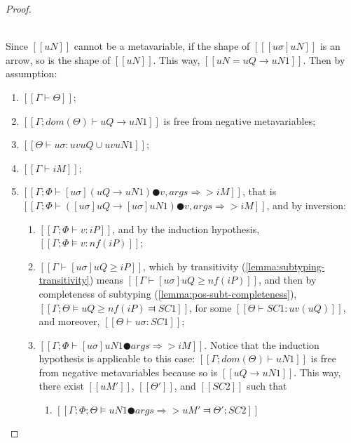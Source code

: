\begin{proof}
\begin{caseof}
        \item {}\\
            Since $[[uN]]$ cannot be a metavariable,  
            if the shape of $[[ [uσ]uN ]]$ is an arrow, 
            so is the shape of $[[uN]]$. This way, 
            $[[uN = uQ → uN1]]$.
            Then by assumption:
            \begin{enumerate}
                \item $[[Γ ⊢ Θ]]$;
                \item $[[Γ; dom(Θ) ⊢  uQ → uN1]]$ is free from negative metavariables;
                \item $[[Θ ⊢ uσ : uv uQ ∪ uv uN1]]$;
                \item $[[Γ ⊢ iM]]$;
                \item $[[Γ; Φ ⊢ [uσ](uQ → uN1) ● v, args ⇒> iM]]$, 
                    \label{point:typing-completeness-arrow-app-inversion}
                    that is $[[Γ; Φ ⊢ ([uσ]uQ → [uσ]uN1) ● v, args ⇒> iM]]$,
                    and by inversion:
                    \begin{enumerate}
                        \item $[[Γ; Φ ⊢ v : iP]]$,
                            and by the induction hypothesis, 
                            $[[Γ; Φ ⊨ v : nf(iP)]]$;
                        \item $[[Γ ⊢ [uσ]uQ ≥ iP]]$, 
                            which by transitivity (\cref{lemma:subtyping-transitivity}) means 
                            $[[Γ ⊢ [uσ]uQ ≥ nf(iP)]]$,
                            and then by completeness of subtyping 
                            (\cref{lemma:pos-subt-completeness}),
                            $[[ Γ; Θ ⊨ uQ ≥ nf(iP) ⫤ SC1 ]]$, 
                            for some $[[Θ ⊢ SC1 : uv(uQ)]]$, and moreover, $[[ Θ ⊢ uσ : SC1 ]]$;
                        \item $[[Γ; Φ ⊢ [uσ]uN1 ● args ⇒> iM]]$. 
                            \label{point:completeness-arrow-app-ih}
                            Notice that the induction hypothesis is applicable to this case:
                            $[[Γ ; dom(Θ) ⊢  uN1]]$ is free from negative metavariables because
                            so is $[[uQ → uN1]]$. This way, there exist 
                            $[[uM']]$, $[[Θ']]$, and $[[SC2]]$ such that 
                            \begin{enumerate}
                                \item $[[ Γ; Φ; Θ ⊨ uN1 ● args ⇒> uM' ⫤ Θ'; SC2 ]]$

\end{enumerate}
\end{enumerate}
\end{enumerate}
\end{caseof}
\end{proof}
